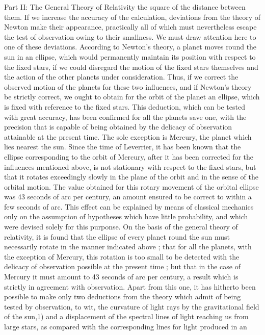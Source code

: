 \documentclass{article}
\begin{document}
Part II: The General Theory of Relativity
the square of the distance between them. If we increase the accuracy of the calculation,
deviations from the theory of Newton make their appearance, practically all of which must
nevertheless escape the test of observation owing to their smallness.
We must draw attention here to one of these deviations. According to Newton's theory, a
planet moves round the sun in an ellipse, which would permanently maintain its position
with respect to the fixed stars, if we could disregard the motion of the fixed stars themselves
and the action of the other planets under consideration. Thus, if we correct the observed
motion of the planets for these two influences, and if Newton's theory be strictly correct, we
ought to obtain for the orbit of the planet an ellipse, which is fixed with reference to the
fixed stars. This deduction, which can be tested with great accuracy, has been confirmed for
all the planets save one, with the precision that is capable of being obtained by the delicacy
of observation attainable at the present time. The sole exception is Mercury, the planet
which lies nearest the sun. Since the time of Leverrier, it has been known that the ellipse
corresponding to the orbit of Mercury, after it has been corrected for the influences
mentioned above, is not stationary with respect to the fixed stars, but that it rotates
exceedingly slowly in the plane of the orbit and in the sense of the orbital motion. The value
obtained for this rotary movement of the orbital ellipse was 43 seconds of arc per century,
an amount ensured to be correct to within a few seconds of arc. This effect can be explained
by means of classical mechanics only on the assumption of hypotheses which have little
probability, and which were devised solely for this purponse.
On the basis of the general theory of relativity, it is found that the ellipse of every planet
round the sun must necessarily rotate in the manner indicated above ; that for all the planets,
with the exception of Mercury, this rotation is too small to be detected with the delicacy of
observation possible at the present time ; but that in the case of Mercury it must amount to
43 seconds of arc per century, a result which is strictly in agreement with observation.
Apart from this one, it has hitherto been possible to make only two deductions from the
theory which admit of being tested by observation, to wit, the curvature of light rays by the
gravitational field of the sun,1) and a displacement of the spectral lines of light reaching us
from large stars, as compared with the corresponding lines for light produced in an
\end{document}
